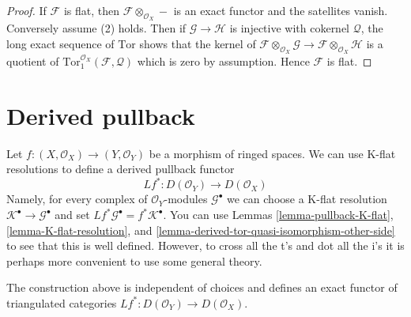 \begin{proof}
If $\mathcal{F}$ is flat, then $\mathcal{F} \otimes_{\mathcal{O}_X} -$
is an exact functor and the satellites vanish. Conversely assume (2)
holds. Then if $\mathcal{G} \to \mathcal{H}$ is injective with cokernel
$\mathcal{Q}$, the long exact sequence of $\text{Tor}$ shows that
the kernel of
$\mathcal{F} \otimes_{\mathcal{O}_X} \mathcal{G} \to
\mathcal{F} \otimes_{\mathcal{O}_X} \mathcal{H}$
is a quotient of
$\text{Tor}_1^{\mathcal{O}_X}(\mathcal{F}, \mathcal{Q})$
which is zero by assumption. Hence $\mathcal{F}$ is flat.
\end{proof}







\section{Derived pullback}
\label{section-derived-pullback}

\noindent
Let $f : (X, \mathcal{O}_X) \to (Y, \mathcal{O}_Y)$
be a morphism of ringed spaces. We can use K-flat resolutions to define
a derived pullback functor
$$
Lf^* : D(\mathcal{O}_Y) \to D(\mathcal{O}_X)
$$
Namely, for every complex of $\mathcal{O}_Y$-modules $\mathcal{G}^\bullet$
we can choose a K-flat resolution
$\mathcal{K}^\bullet \to \mathcal{G}^\bullet$ and set
$Lf^*\mathcal{G}^\bullet = f^*\mathcal{K}^\bullet$.
You can use
Lemmas \ref{lemma-pullback-K-flat},
\ref{lemma-K-flat-resolution}, and
\ref{lemma-derived-tor-quasi-isomorphism-other-side}
to see that this is well defined. However, to cross all the t's and dot all
the i's it is perhaps more convenient to use some general theory.

\begin{lemma}
\label{lemma-derived-base-change}
The construction above is independent of choices and defines an exact
functor of triangulated categories
$Lf^* : D(\mathcal{O}_Y) \to D(\mathcal{O}_X)$.
\end{lemma}

